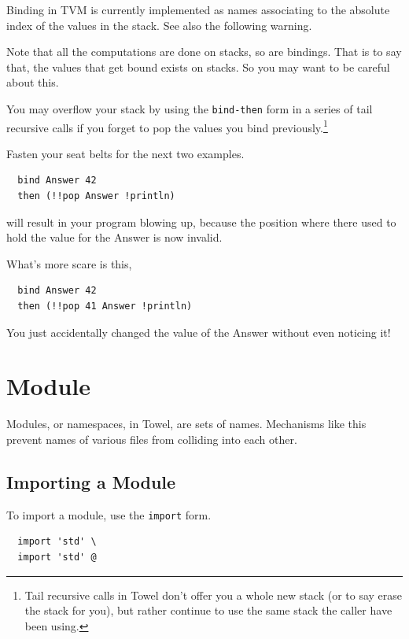 \documentclass{report}
\begin{document}
\begin{mdframed}[style=detail]
  Binding in TVM is currently implemented as names associating to the absolute index of the values in the stack. See also the following warning.
\end{mdframed}

\begin{mdframed}[style=warning]
Note that all the computations are done on stacks, so are bindings. That is to say that, the values that get bound exists on stacks. So you may want to be careful about this.

You may overflow your stack by using the \texttt{bind-then} form in a series of tail recursive calls if you forget to pop the values you bind previously.\footnote{Tail recursive calls in Towel don't offer you a whole new stack (or to say erase the stack for you), but rather continue to use the same stack the caller have been using.}

Fasten your seat belts for the next two examples.

\begin{verbatim}
  bind Answer 42
  then (!!pop Answer !println)
\end{verbatim}

will result in your program blowing up, because the position where there used to hold the value for the Answer is now invalid.

What's more scare is this,

\begin{verbatim}
  bind Answer 42
  then (!!pop 41 Answer !println)
\end{verbatim}

You just accidentally changed the value of the Answer without even noticing it!
\end{mdframed}

\section{Module}

Modules, or namespaces, in Towel, are sets of names. Mechanisms like this prevent names of various files from colliding into each other.

\subsection{Importing a Module}\label{ssec:import}

To import a module, use the \texttt{import} form.
\begin{mdframed}[style=example]
\begin{verbatim}
  import 'std' \
  import 'std' @
\end{verbatim}
\end{mdframed}
\end{document}
